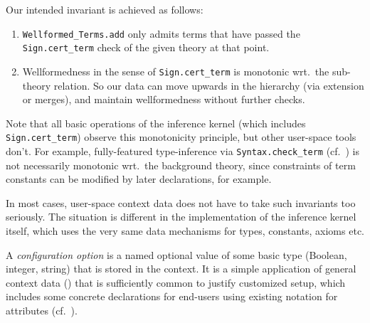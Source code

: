 \begin{isabellebody}
\begin{isamarkuptext}
  \medskip Our intended invariant is achieved as follows:
  \begin{enumerate}

  \item \verb|Wellformed_Terms.add| only admits terms that have passed
  the \verb|Sign.cert_term| check of the given theory at that point.

  \item Wellformedness in the sense of \verb|Sign.cert_term| is
  monotonic wrt.\ the sub-theory relation.  So our data can move
  upwards in the hierarchy (via extension or merges), and maintain
  wellformedness without further checks.

  \end{enumerate}

  Note that all basic operations of the inference kernel (which
  includes \verb|Sign.cert_term|) observe this monotonicity principle,
  but other user-space tools don't.  For example, fully-featured
  type-inference via \verb|Syntax.check_term| (cf.\
  ) is not necessarily monotonic wrt.\ the
  background theory, since constraints of term constants can be
  modified by later declarations, for example.

  In most cases, user-space context data does not have to take such
  invariants too seriously.  The situation is different in the
  implementation of the inference kernel itself, which uses the very
  same data mechanisms for types, constants, axioms etc.%
\end{isamarkuptext}%
\isamarkuptrue%
%
\isamarkupsubsection{Configuration options \label{sec:config-options}%
}
\isamarkuptrue%
%
\begin{isamarkuptext}%
A \emph{configuration option} is a named optional value of
  some basic type (Boolean, integer, string) that is stored in the
  context.  It is a simple application of general context data
  () that is sufficiently common to justify
  customized setup, which includes some concrete declarations for
  end-users using existing notation for attributes (cf.\
  ).


\end{isamarkuptext}
\end{isabellebody}
